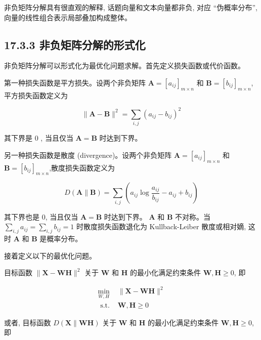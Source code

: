 \documentclass[10pt]{article}
\begin{document}
非负矩阵分解具有很直观的解释, 话题向量和文本向量都非负, 对应 “伪概率分布”, 向量的线性组合表示局部叠加构成整体。

\subsection*{17.3.3 非负矩阵分解的形式化}
非负矩阵分解可以形式化为最优化问题求解。首先定义损失函数或代价函数。

第一种损失函数是平方损失。设两个非负矩阵 $\boldsymbol{A}=\left[a_{i j}\right]_{m \times n}$ 和 $\boldsymbol{B}=\left[b_{i j}\right]_{m \times n}$, 平方损失函数定义为


\begin{equation*}
\|\boldsymbol{A}-\boldsymbol{B}\|^{2}=\sum_{i, j}\left(a_{i j}-b_{i j}\right)^{2} \tag{17.20}
\end{equation*}


其下界是 0 , 当且仅当 $\boldsymbol{A}=\boldsymbol{B}$ 时达到下界。

另一种损失函数是散度 (divergence)。设两个非负矩阵 $\boldsymbol{A}=\left[a_{i j}\right]_{m \times n}$ 和 $\boldsymbol{B}=\left[b_{i j}\right]_{m \times n}$,散度损失函数定义为


\begin{equation*}
D(\boldsymbol{A} \| \boldsymbol{B})=\sum_{i, j}\left(a_{i j} \log \frac{a_{i j}}{b_{i j}}-a_{i j}+b_{i j}\right) \tag{17.21}
\end{equation*}


其下界也是 0, 当且仅当 $\boldsymbol{A}=\boldsymbol{B}$ 时达到下界。 $\boldsymbol{A}$ 和 $\boldsymbol{B}$ 不对称。当 $\sum_{i, j} a_{i j}=\sum_{i, j} b_{i j}=1$ 时散度损失函数退化为 Kullback-Leiber 散度或相对嫡, 这时 $\boldsymbol{A}$ 和 $\boldsymbol{B}$ 是概率分布。

接着定义以下的最优化问题。

目标函数 $\|\boldsymbol{X}-\boldsymbol{W} \boldsymbol{H}\|^{2}$ 关于 $\boldsymbol{W}$ 和 $\boldsymbol{H}$ 的最小化满足约束条件 $\boldsymbol{W}, \boldsymbol{H} \geqslant 0$, 即

\[
\begin{array}{ll}
\min _{W, H} & \|\boldsymbol{X}-\boldsymbol{W} \boldsymbol{H}\|^{2}  \tag{17.22}\\
\text { s.t. } & \boldsymbol{W}, \boldsymbol{H} \geqslant 0
\end{array}
\]

或者, 目标函数 $D(\boldsymbol{X} \| \boldsymbol{W} \boldsymbol{H})$ 关于 $\boldsymbol{W}$ 和 $\boldsymbol{H}$ 的最小化满足约束条件 $\boldsymbol{W}, \boldsymbol{H} \geqslant 0$, 即
\end{document}
